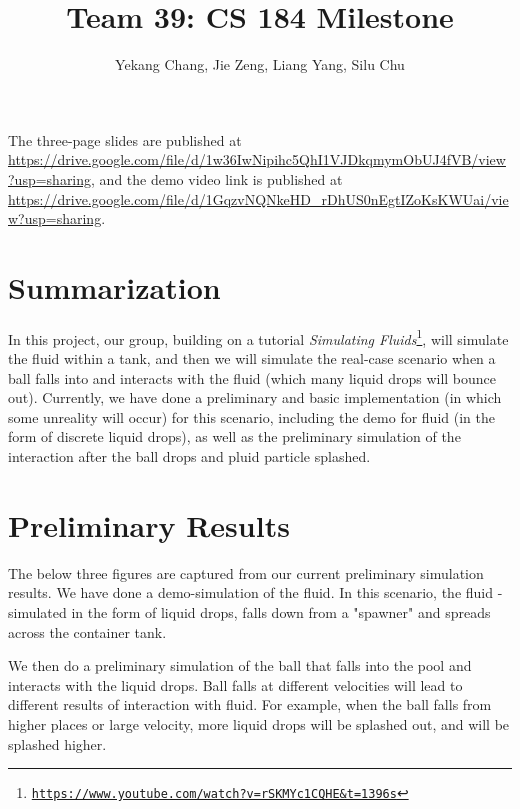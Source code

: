 \documentclass{article}
\title{Team 39: CS 184 Milestone}
\author{Yekang Chang, Jie Zeng, Liang Yang, Silu Chu}
\newcommand\foothref[3]{#1\footnote{\href{#2}{#3}}}
\begin{document}
\maketitle

The three-page slides are published at \url{https://drive.google.com/file/d/1w36IwNipihc5QhI1VJDkqmymObUJ4fVB/view?usp=sharing}, and the demo video link is published at \url{https://drive.google.com/file/d/1GqzvNQNkeHD_rDhUS0nEgtIZoKsKWUai/view?usp=sharing}.

\section{Summarization}

\hspace*{1em}In this project, our group, building on a tutorial \foothref{\textit{Simulating Fluids}}{https://www.youtube.com/watch?v=rSKMYc1CQHE&t=1396s}{\texttt{https://www.youtube.com/watch?v=rSKMYc1CQHE\&t=1396s}},
  will simulate the fluid within a tank, and then we will simulate the real-case scenario when a ball falls into and interacts with the fluid (which many liquid drops will bounce out). Currently, we have done a preliminary and basic implementation (in which some unreality will occur) for this scenario, including the demo for fluid (in the form of discrete liquid drops), as well as the preliminary simulation of the interaction after the ball drops and pluid particle splashed. 

\section{Preliminary Results}

\hspace*{1em}The below three figures are captured from our current preliminary simulation results. We have done a demo-simulation of the fluid. In this scenario, the fluid - simulated in the form of liquid drops, falls down from a "spawner" and spreads across the container tank. 

\noindent\hspace*{1em} We then do a preliminary simulation of the ball that falls into the pool and interacts with the liquid drops. Ball falls at different velocities will lead to different results of interaction with fluid. For example, when the ball falls from higher places or large velocity, more liquid drops will be splashed out, and will be splashed higher. 
\end{document}
